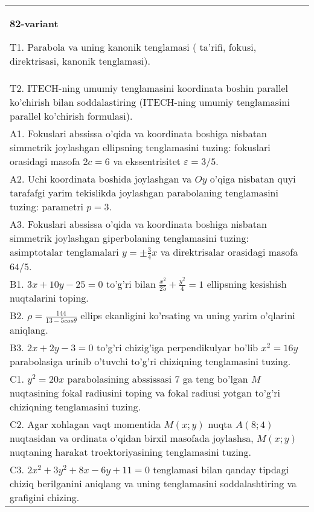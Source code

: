 \documentclass{article}
\begin{document}
\begin{tabular}{m{17cm}}
\textbf{82-variant}
\newline

T1. Parabola va uning kanonik tenglamasi ( ta'rifi, fokusi, direktrisasi, kanonik tenglamasi).\\

T2. ITECH-ning umumiy tenglamasini koordinata boshin parallel ko'chirish bilan soddalastiring (ITECH-ning umumiy tenglamasini parallel ko'chirish formulasi).\\

A1. Fokuslari abssissa o'qida va koordinata boshiga nisbatan simmetrik joylashgan ellipsning tenglamasini tuzing: fokuslari orasidagi masofa $2c=6$ va ekssentrisitet $\varepsilon=3/5$.\\

A2. Uchi koordinata boshida joylashgan va $Oy$ o'qiga nisbatan quyi tarafafgi yarim tekislikda joylashgan parabolaning tenglamasini tuzing: parametri $p=3$.\\

A3. Fokuslari abssissa o'qida va koordinata boshiga nisbatan simmetrik joylashgan giperbolaning tenglamasini tuzing: asimptotalar tenglamalari $y=\pm \frac{3}{4}x$ va direktrisalar orasidagi masofa $64/5$.\\

B1. $3x + 10y - 25 = 0$ to'g'ri bilan $\frac{x^{2}}{25} + \frac{y^{2}}{4} = 1$ ellipsning kesishish nuqtalarini toping.  \\

B2. $\rho = \frac{144}{13 - 5cos\theta}$ ellips ekanligini ko'rsating va uning yarim o'qlarini aniqlang.\\

B3. $2x + 2y - 3 = 0$ to'g'ri chizig'iga perpendikulyar bo'lib $x^{2} = 16y$ parabolasiga urinib o'tuvchi to'g'ri chiziqning tenglamasini tuzing.  \\

C1. $y^{2} = 20x$ parabolasining abssissasi 7 ga teng bo'lgan $M$ nuqtasining fokal radiusini toping va fokal radiusi yotgan to'g'ri chiziqning tenglamasini tuzing.  \\

C2. Agar xohlagan vaqt momentida $M(x;y)$ nuqta $A(8;4)$ nuqtasidan va ordinata o'qidan birxil masofada joylashsa, $M(x;y)$ nuqtaning harakat troektoriyasining tenglamasini tuzing.  \\

C3. $2x^{2} + 3y^{2} + 8x - 6y + 11 = 0$ tenglamasi bilan qanday tipdagi chiziq berilganini aniqlang va uning tenglamasini soddalashtiring va grafigini chizing.  \\

\end{tabular}
\vspace{1cm}
\end{document}
